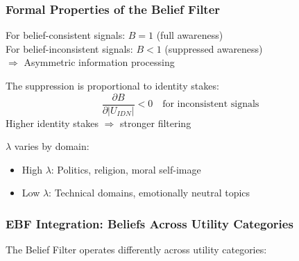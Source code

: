 \subsubsection{Formal Properties of the Belief Filter}
\label{subsubsec:formal-properties}

\begin{tcolorbox}[colback=gray!5!white, colframe=gray!75!black, title=Property 1: Asymmetric Updating]
For belief-consistent signals: $B = 1$ (full awareness)\\
For belief-inconsistent signals: $B < 1$ (suppressed awareness)\\
$\Rightarrow$ Asymmetric information processing
\end{tcolorbox}

\begin{tcolorbox}[colback=gray!5!white, colframe=gray!75!black, title=Property 2: Stakes Dependence]
The suppression is proportional to identity stakes:
\begin{equation}
\frac{\partial B}{\partial |U_{IDN}|} < 0 \quad \text{for inconsistent signals}
\end{equation}
Higher identity stakes $\Rightarrow$ stronger filtering
\end{tcolorbox}

\begin{tcolorbox}[colback=gray!5!white, colframe=gray!75!black, title=Property 3: Domain Specificity]
$\lambda$ varies by domain:
\begin{itemize}
\item High $\lambda$: Politics, religion, moral self-image
\item Low $\lambda$: Technical domains, emotionally neutral topics
\end{itemize}
\end{tcolorbox}

\subsubsection{EBF Integration: Beliefs Across Utility Categories}
\label{subsubsec:bcm-integration}

The Belief Filter operates differently across utility categories:

